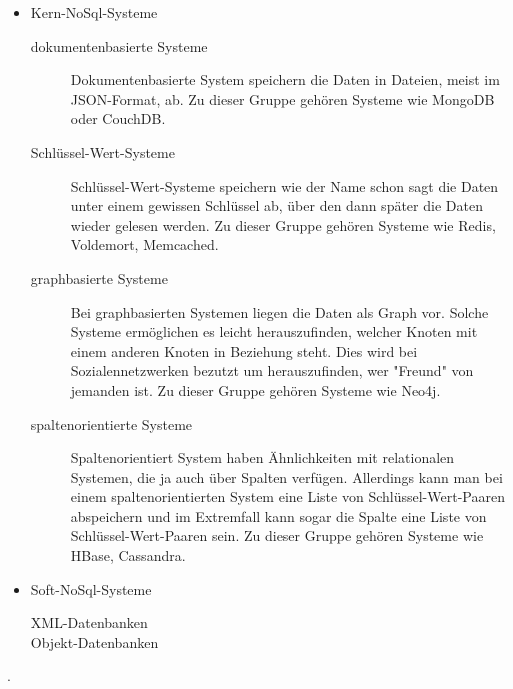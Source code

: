 \begin{itemize}
\item Kern-NoSql-Systeme
\begin{description}
\item[dokumentenbasierte Systeme] Dokumentenbasierte System speichern die Daten
in Dateien, meist im JSON-Format, ab. Zu dieser Gruppe gehören Systeme wie
MongoDB oder CouchDB.
\item[Schlüssel-Wert-Systeme] Schlüssel-Wert-Systeme speichern wie der Name schon
sagt die Daten unter einem gewissen Schlüssel ab, über den dann später die Daten
wieder gelesen werden. Zu dieser Gruppe gehören Systeme wie Redis, Voldemort,
Memcached.
\item[graphbasierte Systeme] Bei graphbasierten Systemen liegen die Daten als
Graph vor. Solche Systeme ermöglichen es leicht herauszufinden, welcher Knoten
mit einem anderen Knoten in Beziehung steht. Dies wird bei Sozialennetzwerken
bezutzt um herauszufinden, wer "Freund" von jemanden ist. Zu dieser Gruppe
gehören Systeme wie Neo4j.
\item[spaltenorientierte Systeme] Spaltenorientiert System haben Ähnlichkeiten
mit relationalen Systemen, die ja auch über Spalten verfügen. Allerdings kann man
bei einem spaltenorientierten System eine Liste von Schlüssel-Wert-Paaren
abspeichern und im Extremfall kann sogar die Spalte eine Liste von
Schlüssel-Wert-Paaren sein. Zu dieser Gruppe gehören Systeme wie HBase, Cassandra.
\end{description}
\item Soft-NoSql-Systeme
\begin{description}
\item[XML-Datenbanken]
\item[Objekt-Datenbanken]
\end{description}
\end{itemize}

.
